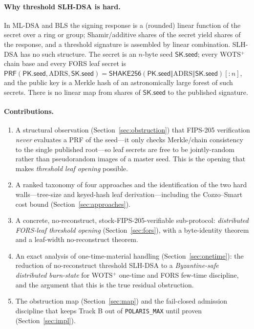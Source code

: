 \documentclass[11pt,a4paper]{article}
\newcommand{\PRF}{\mathsf{PRF}}
\newcommand{\skseed}{\mathsf{SK.seed}}
\newcommand{\pkseed}{\mathsf{PK.seed}}
\begin{document}
\paragraph{Why threshold SLH-DSA is hard.}
In ML-DSA and BLS the signing response is a (rounded) linear function of the
secret over a ring or group; Shamir/additive shares of the secret yield shares of
the response, and a threshold signature is assembled by linear combination. SLH-DSA
has no such structure. The secret is an $n$-byte seed $\skseed$; every WOTS$^+$
chain base and every FORS leaf secret is $\PRF(\pkseed,\mathrm{ADRS},\skseed) =
\mathsf{SHAKE256}(\pkseed\Vert\mathrm{ADRS}\Vert\skseed)[{:}n]$, and the public key
is a Merkle hash of an astronomically large forest of such secrets. There is no
linear map from shares of $\skseed$ to the published signature.

\paragraph{Contributions.}
\begin{enumerate}[leftmargin=1.6em]
\item A structural observation (Section~\ref{sec:obstruction}) that FIPS-205
verification \emph{never} evaluates a PRF of the seed---it only checks
Merkle/chain consistency to the single published root---so leaf secrets are free
to be jointly-random rather than pseudorandom images of a master seed. This is the
opening that makes \emph{threshold leaf opening} possible.
\item A ranked taxonomy of four approaches and the identification of the two hard
walls---tree-size and keyed-hash leaf derivation---including the Cozzo--Smart cost
bound (Section~\ref{sec:approaches}).
\item A concrete, no-reconstruct, stock-FIPS-205-verifiable sub-protocol:
\emph{distributed FORS-leaf threshold opening} (Section~\ref{sec:fors}), with a
byte-identity theorem and a leaf-width no-reconstruct theorem.
\item An exact analysis of one-time-material handling (Section~\ref{sec:onetime}):
the reduction of no-reconstruct threshold SLH-DSA to a \emph{Byzantine-safe
distributed burn-state} for WOTS$^+$ one-time and FORS few-time discipline, and
the argument that this is the true residual obstruction.
\item The obstruction map (Section~\ref{sec:map}) and the fail-closed admission
discipline that keeps Track B out of \texttt{POLARIS\_MAX} until proven
(Section~\ref{sec:impl}).
\end{enumerate}
\end{document}
